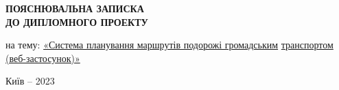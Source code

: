 \clearpage
\begin{center}
\vspace*{\fill}

{\fontsize{18}{22}\selectfont
\textbf{\uppercase{Пояснювальна записка \\ до дипломного проекту}}
}

на тему: \underline{«Система планування маршрутів подорожі громадським} \newline 
\underline{транспортом (веб-застосунок)»}
\vfill %

Київ -- 2023
\end{center}

\thispagestyle{empty}

\clearpage